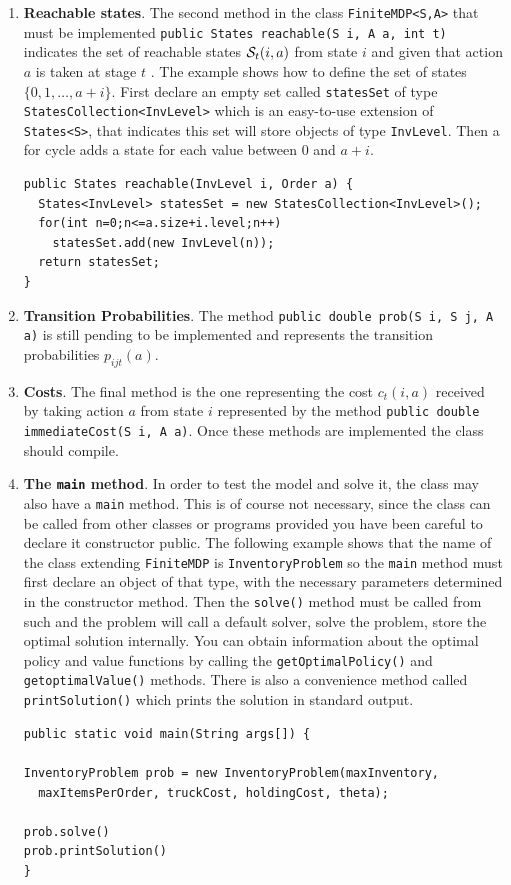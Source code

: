 \documentclass[11pt]{article}
\newcommand {\cS}{\ensuremath \mathcal{S}}
\newcommand {\lil}{\lstinline}
\begin{document}
\begin{enumerate}
\item \textbf{Reachable states}. The second method in the class \lstinline!FiniteMDP<S,A>! that must be implemented \lstinline!public States reachable(S i, A a, int t)! indicates the set of reachable states $\cS_t(i,a)$ from state $i$ and given that action $a$ is taken at stage $t$ . The example shows how to define the set of states $\{0,1,\ldots,a+i\}$. First declare an empty set called \lstinline!statesSet! of type \lstinline!StatesCollection<InvLevel>! which is an easy-to-use extension of \lstinline!States<S>!, that indicates this set will store objects of type \lstinline!InvLevel!. Then a for cycle adds a state for each value between 0 and $a+i$.
\lstset{title=,caption=}
\begin{lstlisting}
public States reachable(InvLevel i, Order a) {
  States<InvLevel> statesSet = new StatesCollection<InvLevel>();
  for(int n=0;n<=a.size+i.level;n++)
    statesSet.add(new InvLevel(n));
  return statesSet;
}
\end{lstlisting}

\item \textbf{Transition Probabilities}. The method \lstinline!public double prob(S i, S j, A a)! is still pending to be implemented and represents the transition probabilities $p_{ijt}(a)$.

\item \textbf{Costs}. The final method is the one representing the cost $c_t(i,a)$ received by taking action $a$ from state $i$ represented by the method \lstinline!public double immediateCost(S i, A a)!. Once these methods are implemented the class should compile.

\item \textbf{The \lstinline!main! method}. In order to test the model and solve it, the class may also have a \lstinline!main! method. This is of course not necessary, since the class can be called from other classes or programs provided you have been careful to declare it constructor public. The following example shows that the name of the class extending \lstinline!FiniteMDP! is \lstinline!InventoryProblem! so the \lstinline!main! method must first declare an object of that type, with the necessary parameters determined in the constructor method. Then the \lstinline!solve()! method must be called from such and the problem will call a default solver, solve the problem, store the optimal solution internally. You can obtain information about the optimal policy and value functions by calling the \lil!getOptimalPolicy()! and \lil!getoptimalValue()! methods. There is also a convenience method called \lil!printSolution()! which prints the solution in standard output.


\begin{lstlisting}
public static void main(String args[]) {

InventoryProblem prob = new InventoryProblem(maxInventory,
  maxItemsPerOrder, truckCost, holdingCost, theta);

prob.solve()
prob.printSolution()
}
\end{lstlisting}
\end{enumerate}
\end{document}
